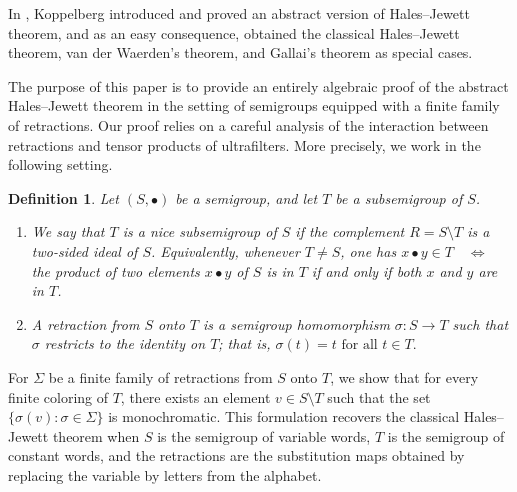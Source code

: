\documentclass[12pt]{amsart}
\newtheorem{definition}{Definition}
\begin{document}
In \cite{Kop}, Koppelberg introduced and proved an abstract version of Hales--Jewett theorem, and as an easy consequence,  obtained the classical Hales--Jewett theorem, van der Waerden’s theorem, and Gallai’s theorem as special cases.

The purpose of this paper is to provide an entirely algebraic proof of the abstract Hales--Jewett theorem in the setting of semigroups equipped with a finite family of retractions. Our proof relies on a careful analysis of the interaction between retractions and tensor products of ultrafilters. More precisely, we work in the following setting.

\begin{definition}
Let $(S,\bullet)$ be a semigroup, and let $T$ be a subsemigroup of $S$.
\begin{enumerate}
    \item We say that $T$ is a \emph{nice subsemigroup} of $S$ if the complement $R=S\setminus T$
    is a two-sided ideal of $S$. Equivalently, whenever $T\neq S$, one has
    $x\bullet y\in T
    \quad\Longleftrightarrow\quad$
    the product of two elements $x \bullet y$ of $S$ is in $T$ if and only if both $x$ and $y$ are in $T$.

    \item A \emph{retraction} from $S$ onto $T$ is a semigroup homomorphism
    $\sigma\colon S\to T$
    such that $\sigma$ restricts to the identity on $T$; that is, $
    \sigma(t)=t  \text{ for all } t\in T.$
\end{enumerate}
\end{definition}

For  $\Sigma$ be a finite family of retractions from $S$ onto $T$, we show that for every finite coloring of $T$, there exists an element $v\in S\setminus T$ such that the set $\{\sigma(v):\sigma\in\Sigma\}$ is monochromatic. This formulation recovers the classical Hales--Jewett theorem when $S$ is the semigroup of variable words, $T$ is the semigroup of constant words, and the retractions are the substitution maps obtained by replacing the variable by letters from the alphabet.
\end{document}
